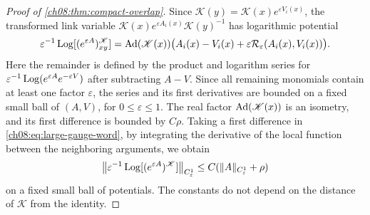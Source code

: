 \begin{proof}[Proof of \cref{ch08:thm:compact-overlap}]
Since $\mathscr K(y)=\mathscr K(x)e^{\varepsilon V_i(x)}$, the transformed link variable $\mathscr K(x)e^{\varepsilon A_i(x)}\mathscr K(y)^{-1}$ has logarithmic potential
\begin{equation}\label{ch08:eq:large-gauge-word}
 \varepsilon^{-1}\operatorname{Log}[(e^{\varepsilon A})^{\mathscr K}_{xy}]
 =\operatorname{Ad}(\mathscr K(x))
       \big(A_i(x)-V_i(x)+\varepsilon\mathcal R_\varepsilon(A_i(x),V_i(x))\big).
\end{equation}
Here the remainder is defined by the product and logarithm series for $\varepsilon^{-1}\operatorname{Log}(e^{\varepsilon A}e^{-\varepsilon V})$ after subtracting $A-V$. Since all remaining monomials contain at least one factor $\varepsilon$, the series and its first derivatives are bounded on a fixed small ball of $(A,V)$, for $0\le\varepsilon\le1$. The real factor $\operatorname{Ad}(\mathscr K(x))$ is an isometry, and its first difference is bounded by $C\rho$. Taking a first difference in \eqref{ch08:eq:large-gauge-word}, by integrating the derivative of the local function between the neighboring arguments, we obtain
\begin{equation}\label{ch08:eq:large-gauge-c1}
 \big\|\varepsilon^{-1}\operatorname{Log}[(e^{\varepsilon A})^{\mathscr K}]
                                      \big\|_{C^1_\varepsilon}
       \le C(\|A\|_{C^1_\varepsilon}+\rho)
\end{equation}
on a fixed small ball of potentials. The constants do not depend on the distance of $\mathscr K$ from the identity.


\end{proof}
